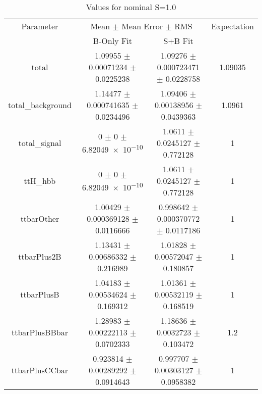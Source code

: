 \begin{table}
\centering
\caption{Values for nominal S=1.0}
\begin{tabular}{cccc}
\toprule
Parameter & \multicolumn{2}{c}{Mean $\pm$ Mean Error $\pm$ RMS} & Expectation\\
 & B-Only Fit & S+B Fit & \\
\midrule
total & \num{1.09955} $\pm$ \num{0.00071234} $\pm$ \num{0.0225238} & \num{1.09276} $\pm$ \num{0.000723471} $\pm$ \num{0.0228758} & \num{1.09035}\\
total\_background & \num{1.14477} $\pm$ \num{0.000741635} $\pm$ \num{0.0234496} & \num{1.09406} $\pm$ \num{0.00138956} $\pm$ \num{0.0439363} & \num{1.0961}\\
total\_signal & \num{0} $\pm$ \num{0} $\pm$ \num{6.82049e-10} & \num{1.0611} $\pm$ \num{0.0245127} $\pm$ \num{0.772128} & \num{1}\\
ttH\_hbb & \num{0} $\pm$ \num{0} $\pm$ \num{6.82049e-10} & \num{1.0611} $\pm$ \num{0.0245127} $\pm$ \num{0.772128} & \num{1}\\
ttbarOther & \num{1.00429} $\pm$ \num{0.000369128} $\pm$ \num{0.0116666} & \num{0.998642} $\pm$ \num{0.000370772} $\pm$ \num{0.0117186} & \num{1}\\
ttbarPlus2B & \num{1.13431} $\pm$ \num{0.00686332} $\pm$ \num{0.216989} & \num{1.01828} $\pm$ \num{0.00572047} $\pm$ \num{0.180857} & \num{1}\\
ttbarPlusB & \num{1.04183} $\pm$ \num{0.00534624} $\pm$ \num{0.169312} & \num{1.01361} $\pm$ \num{0.00532119} $\pm$ \num{0.168519} & \num{1}\\
ttbarPlusBBbar & \num{1.28983} $\pm$ \num{0.00222113} $\pm$ \num{0.0702333} & \num{1.18636} $\pm$ \num{0.0032723} $\pm$ \num{0.103472} & \num{1.2}\\
ttbarPlusCCbar & \num{0.923814} $\pm$ \num{0.00289292} $\pm$ \num{0.0914643} & \num{0.997707} $\pm$ \num{0.00303127} $\pm$ \num{0.0958382} & \num{1}\\
\bottomrule
\end{tabular}
\end{table}